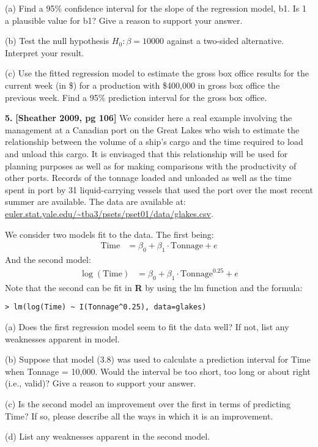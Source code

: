 \documentclass[12pt]{article}
\begin{document}
(a) Find a 95\% confidence interval for the slope of the regression model, b1. Is 1 a plausible value for b1? Give a reason to support your answer.

(b) Test the null hypothesis $H_0: \beta =10000$ against a two-sided alternative. Interpret your result.

(c) Use the fitted regression model to estimate the gross box office results for the current week (in \$) for a production with \$400,000 in gross box office the previous week. Find a 95\% prediction interval for the gross box office.

{\bf 5.} {\bf [Sheather 2009, pg 106]} We consider here a real example involving
the management at a Canadian port on the Great Lakes who wish to estimate the relationship between
the volume of a ship’s cargo and the time required to load and unload this cargo. It is envisaged
that this relationship will be used for planning purposes as well as for making comparisons with
the productivity of other ports. Records of the tonnage loaded and unloaded as well as the time
spent in port by 31 liquid-carrying vessels that used the port over the most recent summer are
available. The data are available at: \url{euler.stat.yale.edu/~tba3/psets/pset01/data/glakes.csv}.

We consider two models fit to the data. The first being:
\begin{align}
\text{Time} &= \beta_0 + \beta_1 \cdot \text{Tonnage} + e
\end{align}
And the second model:
\begin{align}
\log(\text{Time}) &= \beta_0 + \beta_1 \cdot \text{Tonnage}^{0.25} + e
\end{align}
Note that the second can be fit in {\bf R} by using the lm function and
the formula:
\begin{verbatim}
> lm(log(Time) ~ I(Tonnage^0.25), data=glakes)
\end{verbatim}

(a) Does the first regression model seem to fit the data well?
If not, list any weaknesses apparent in model.

(b) Suppose that model (3.8) was used to calculate a prediction
interval for Time when Tonnage = 10,000. Would the interval be
too short, too long or about right (i.e., valid)? Give a reason
to support your answer.

(c) Is the second model an improvement over the first in terms of predicting Time?
If so, please describe all the ways in which it is an improvement.

(d) List any weaknesses apparent in the second model.
\end{document}
